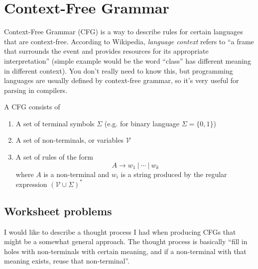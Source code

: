 \documentclass[10pt]{article}
\title{}
\newcommand{\mapto}{\rightarrow}
\begin{document}
\pagestyle{fancy}
\fancyhf{} %
\cfoot{\thepage}
\renewcommand{\headrulewidth}{1pt}

\section{Context-Free Grammar}
Context-Free Grammar (CFG) is a way to describe rules for certain languages that are context-free. According to Wikipedia, \emph{language context} refers to ``a frame that surrounds the event and provides resources for its appropriate interpretation'' (simple example would be the word ``class'' has different meaning in different context). You don't really need to know this, but programming languages are usually defined by context-free grammar, so it's very useful for parsing in compilers.

\noindent A CFG consists of
\begin{enumerate}
\item A set of terminal symbols $\Sigma$ (e.g. for binary language $\Sigma=\{0,1\}$)
\item A set of non-terminals, or variables $\mathcal{V}$
\item A set of rules of the form
  $$A \mapto w_1\ |\ \cdots\ |\ w_k$$
  where $A$ is a non-terminal and $w_i$ is a string produced by the regular expression $(\mathcal{V}\cup\Sigma)^*$
\end{enumerate}

\subsection{Worksheet problems}
I would like to describe a thought process I had when producing CFGs that might be a somewhat general approach. ​The thought process is basically ``fill in holes with non-terminals with certain meaning, and if a non-terminal with that meaning exists, reuse that non-terminal''. %
\end{document}
